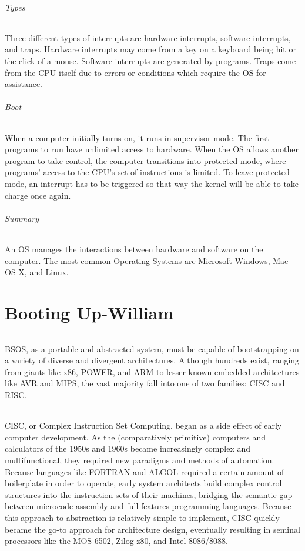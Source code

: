 \documentclass[english]{paper}
\begin{document}
\paragraph{Types}
Three different types of interrupts are hardware interrupts, software interrupts, and traps. Hardware interrupts may come from a key on a keyboard being hit or the click of a mouse. Software interrupts are generated by programs. Traps come from the CPU itself due to errors or conditions which require the OS for assistance.

\paragraph{Boot}
When a computer initially turns on, it runs in supervisor mode. The first programs to run have unlimited access to hardware. When the OS allows another program to take control, the computer transitions into protected mode, where programs' access to the CPU's set of instructions is limited. To leave protected mode, an interrupt has to be triggered so that way the kernel will be able to take charge once again.

\paragraph{Summary}
An OS manages the interactions between hardware and software on the computer. The most common Operating Systems are Microsoft Windows, Mac OS X, and Linux.

\part{Booting Up-William}
\paragraph{}
BSOS, as a portable and abstracted system, must be capable of bootstrapping on a variety of diverse and divergent architectures. Although hundreds exist, ranging from giants like x86, POWER, and ARM to lesser known embedded architectures like AVR and MIPS, the vast majority fall into one of two families: CISC and RISC.

\paragraph{}
CISC, or Complex Instruction Set Computing, began as a side effect of early computer development. As the (comparatively primitive) computers and calculators of the 1950s and 1960s became increasingly complex and multifunctional, they required new paradigms and methods of automation. Because languages like FORTRAN and ALGOL required a certain amount of boilerplate in order to operate, early system architects build complex control structures into the instruction sets of their machines, bridging the semantic gap between microcode-assembly and full-features programming languages. Because this approach to abstraction is relatively simple to implement, CISC quickly became the go-to approach for architecture design, eventually resulting in seminal processors like the MOS 6502, Zilog z80, and Intel 8086/8088.
\end{document}
